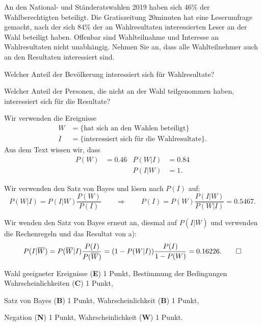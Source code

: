 An den National- und Ständeratswahlen 2019 haben sich 46\% der 
Wahlberechtigten beteiligt.
Die Gratiszeitung 20minuten hat eine Leserumfrage gemacht, nach der sich
84\% der an Wahlresultaten interessierten Leser an der Wahl beteiligt haben.
Offenbar sind Wahlteilnahme und Interesse an Wahlresultaten nicht unabhängig.
Nehmen Sie an, dass alle Wahlteilnehmer auch an den Resultaten interessiert
sind.
\begin{teilaufgaben}
\item
Welcher Anteil der Bevölkerung interessiert sich für Wahlresultate?
\item 
Welcher Anteil der Personen, die nicht an der Wahl teilgenommen haben,
interessiert sich für die Resultate?
\end{teilaufgaben}

\begin{loesung}
Wir verwenden die Ereignisse
\begin{align*}
W&=\{\text{hat sich an den Wahlen beteiligt}\}
\\
I&=\{\text{interessiert sich für die Wahlresultate}\}.
\end{align*}
Aus dem Text wissen wir, dass
\begin{align*}
P(W)&=0.46&P(W|I)&=0.84\\
    &     &P(I|W)&=1.
\end{align*}
\begin{teilaufgaben}
\item
Wir verwenden den Satz von Bayes und lösen nach $P(I)$ auf:
\[
P(W|I)=P(I|W)\frac{P(W)}{P(I)}
\qquad\Rightarrow\qquad
P(I)=P(W) \frac{P(I|W)}{P(W|I)}
=
0.5467.
\]
\item
Wir wenden den Satz von Bayes erneut an, diesmal auf $P(I|\overline{W})$ und
verwenden die Rechenregeln und das Resultat von a):
\[
P(I|\overline{W})
=
P(\overline{W}|I)\frac{P(I)}{P(\overline{W})}
=
(1-P(W|I))\frac{P(I)}{1-P(W)} = 0.16226.
\qedhere
\]
\end{teilaufgaben}
\end{loesung}

\begin{bewertung}
Wahl geeigneter Ereignisse ({\bf E}) 1 Punkt,
Bestimmung der Bedingungen Wahrscheinlichkeiten ({\bf C}) 1 Punkt,
\begin{teilaufgaben}
\item
Satz von Bayes ({\bf B}) 1 Punkt,
Wahrscheinlichkeit ({\bf B}) 1 Punkt,
\item
Negation ({\bf N}) 1 Punkt,
Wahrscheinlichkeit ({\bf W}) 1 Punkt.
\end{teilaufgaben}
\end{bewertung}
